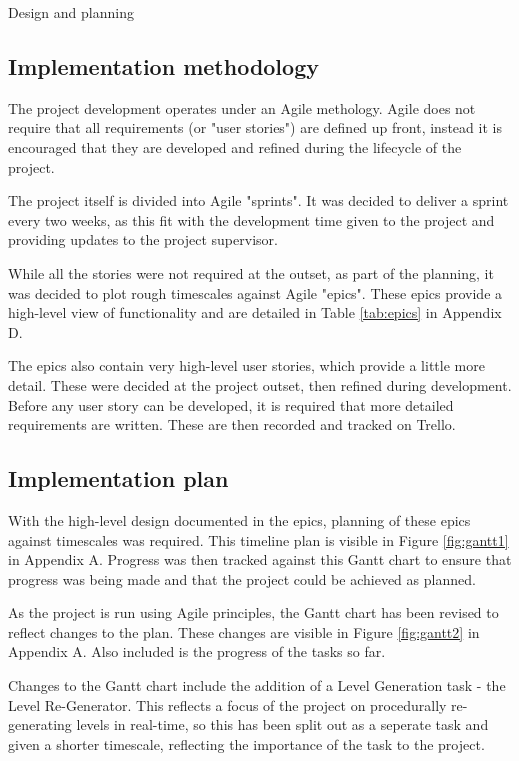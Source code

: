\documentclass[progress]{cmpreport}
\begin{document}
\begin{section}{Design and planning}

\subsection{Implementation methodology}
The project development operates under an Agile methology. Agile does not require that all requirements (or "user stories") are defined up front, instead it is encouraged that they are developed and refined during the lifecycle of the project.

The project itself is divided into Agile "sprints". It was decided to deliver a sprint every two weeks, as this fit with the development time given to the project and providing updates to the project supervisor.

While all the stories were not required at the outset, as part of the planning, it was decided to plot rough timescales against Agile "epics". These epics provide a high-level view of functionality and are detailed in Table \ref{tab:epics} in Appendix D.

The epics also contain very high-level user stories, which provide a little more detail. These were decided at the project outset, then refined during development. Before any user story can be developed, it is required that more detailed requirements are written. These are then recorded and tracked on Trello. 

\subsection{Implementation plan}

With the high-level design documented in the epics, planning of these epics against timescales was required. This timeline plan is visible in Figure \ref{fig:gantt1} in Appendix A. Progress was then tracked against this Gantt chart to ensure that progress was being made and that the project could be achieved as planned.

As the project is run using Agile principles, the Gantt chart has been revised to reflect changes to the plan. These changes are visible in Figure \ref{fig:gantt2} in Appendix A. Also included is the progress of the tasks so far.

Changes to the Gantt chart include the addition of a Level Generation task - the Level Re-Generator. This reflects a focus of the project on procedurally re-generating levels in real-time, so this has been split out as a seperate task and given a shorter timescale, reflecting the importance of the task to the project.


\end{section}
\end{document}
